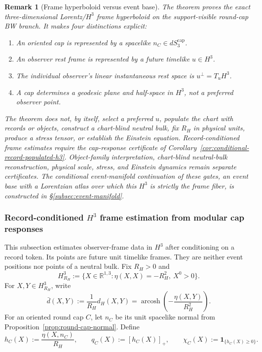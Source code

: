 \documentclass[11pt]{article}
\newtheorem{remark}[theorem]{Remark}
\begin{document}
\begin{remark}[Frame hyperboloid versus event base]\label{rem:h3-chart-not-populated-bulk}
The theorem proves the exact three-dimensional Lorentz/\(H^3\) frame hyperboloid
on the support-visible round-cap BW branch. It makes four distinctions
explicit:
\begin{enumerate}[leftmargin=2em]
\item An oriented cap is represented by a spacelike
\(n_C\in dS_3^{\mathrm{cap}}\).
\item An observer rest frame is represented by a future timelike \(u\in H^3\).
\item The individual observer's linear instantaneous rest space is
\(u^\perp=T_uH^3\).
\item A cap determines a geodesic plane and half-space in \(H^3\), not a
preferred observer point.
\end{enumerate}
The theorem does not, by itself, select a preferred \(u\), populate the chart
with records or objects, construct a chart-blind neutral bulk, fix \(R_H\) in
physical units, produce a stress tensor, or establish the Einstein equation.
Record-conditioned frame estimates require the cap-response certificate of
Corollary~\ref{cor:conditional-record-populated-h3}.
Object-family interpretation, chart-blind neutral-bulk reconstruction, physical
scale, stress, and Einstein dynamics remain separate certificates. The conditional
event-manifold continuation of these gates, an event base with a Lorentzian atlas over
which this \(H^3\) is strictly the frame fiber, is constructed in
\S\ref{subsec:event-manifold}.
\end{remark}
\subsubsection{Record-conditioned \(H^3\) frame estimation from modular cap responses}
\label{subsec:record-populated-h3-localization}

This subsection estimates observer-frame data in \(H^3\) after conditioning on a
record token. Its points are future unit timelike frames. They are neither event
positions nor points of a neutral bulk. Fix \(R_H>0\) and
\[
H^3_{R_H}:=\{X\in\mathbb R^{1,3}:\eta(X,X)=-R_H^2,\ X^0>0\}.
\]
For \(X,Y\in H^3_{R_H}\), write
\[
\bar d(X,Y):=\frac{1}{R_H}d_H(X,Y)
=\operatorname{arcosh}\!\left(-\frac{\eta(X,Y)}{R_H^2}\right).
\]
For an oriented round cap \(C\), let \(n_C\) be its unit spacelike normal from
Proposition~\ref{prop:round-cap-normal}. Define
\[
h_C(X):=\frac{\eta(X,n_C)}{R_H},\qquad
q_C(X):=[h_C(X)]_+,\qquad
\chi_C(X):=\mathbf 1_{\{h_C(X)\geq0\}}.
\]
\end{document}
